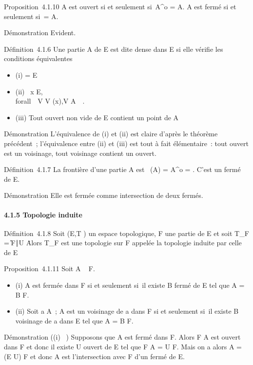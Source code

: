 \documentclass[]{article}
\begin{document}
Proposition~4.1.10 A est ouvert si et seulement si~A^o = A. A
est fermé si et seulement si~\overlineA = A.

Démonstration Evident.

Définition~4.1.6 Une partie A de E est dite dense dans E si elle vérifie
les conditions équivalentes

\begin{itemize}
\itemsep1pt\parskip0pt
\item
  (i) \overlineA = E
\item
  (ii) \forall~x \in E, \\forall~~V \in
  V (x),\quad V \bigcap A\neq~\varnothing~.
\item
  (iii) Tout ouvert non vide de E contient un point de A
\end{itemize}

Démonstration L'équivalence de (i) et (ii) est claire d'après le
théorème précédent~; l'équivalence entre (ii) et (iii) est tout à fait
élémentaire~: tout ouvert est un voisinage, tout voisinage contient un
ouvert.

Définition~4.1.7 La frontière d'une partie A est
\mathrmFr~(A) =
\overlineA \diagdown A^o =
\overlineA \bigcap\overlinecA. C'est un
fermé de E.

Démonstration Elle est fermée comme intersection de deux fermés.

\paragraph{4.1.5 Topologie induite}

Définition~4.1.8 Soit (E,T ) un espace topologique, F une partie de E et
soit T_F = \U \bigcap F∣U
\inT\. Alors T_F est une topologie sur F appelée
la topologie induite par celle de E

Proposition~4.1.11 Soit A \subset~ F.

\begin{itemize}
\itemsep1pt\parskip0pt
\item
  (i) A est fermée dans F si et seulement si~il existe B fermé de E tel
  que A = B \bigcap F.
\item
  (ii) Soit a \in A~; A est un voisinage de a dans F si et seulement si~il
  existe B voisinage de a dans E tel que A = B \bigcap F.
\end{itemize}

Démonstration ((i) \rigtharrow~) Supposons que A est fermé dans F. Alors F \diagdown A est
ouvert dans F et donc il existe U ouvert de E tel que F \diagdown A = U \bigcap F.
Mais on a alors A = (E \diagdown U) \bigcap F et donc A est l'intersection avec F d'un
fermé de E.
\end{document}
